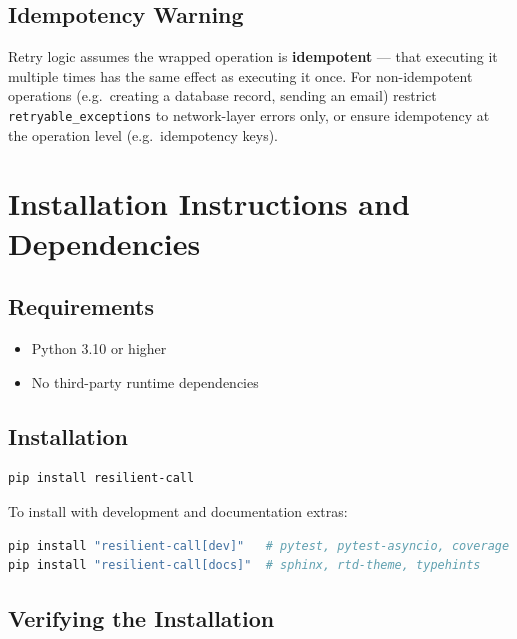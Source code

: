 \subsection{Idempotency Warning}

\begin{warningbox}
Retry logic assumes the wrapped operation is \textbf{idempotent} — that
executing it multiple times has the same effect as executing it once.
For non-idempotent operations (e.g.\ creating a database record, sending
an email) restrict \texttt{retryable\_exceptions} to network-layer errors
only, or ensure idempotency at the operation level (e.g.\ idempotency keys).
\end{warningbox}

\section{Installation Instructions and Dependencies}
\label{sec:installation}

\subsection{Requirements}

\begin{itemize}[leftmargin=*, label=\textbullet]
    \item Python 3.10 or higher
    \item No third-party runtime dependencies
\end{itemize}

\subsection{Installation}

\begin{lstlisting}[language=bash, numbers=none, frame=none, backgroundcolor=\color{backcolour}]
pip install resilient-call
\end{lstlisting}

To install with development and documentation extras:

\begin{lstlisting}[language=bash, numbers=none, frame=none, backgroundcolor=\color{backcolour}]
pip install "resilient-call[dev]"   # pytest, pytest-asyncio, coverage
pip install "resilient-call[docs]"  # sphinx, rtd-theme, typehints
\end{lstlisting}

\subsection{Verifying the Installation}

